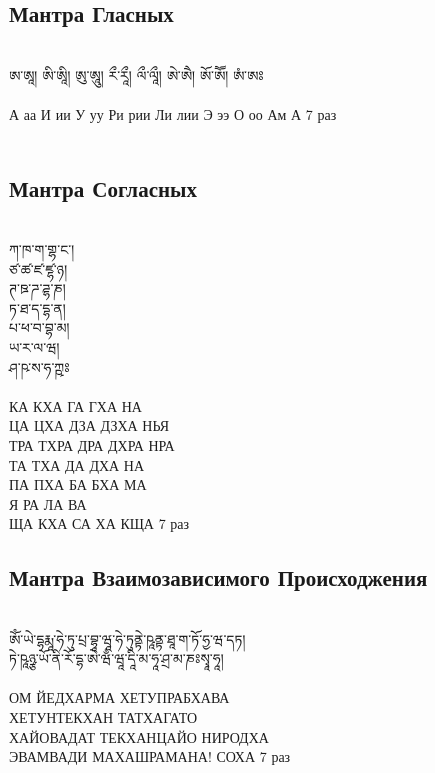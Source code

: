 \subsection*{Мантра Гласных}
\\
\ti
ཨ་ཨཱ། ཨི་ཨཱི། ཨུ་ཨཱུ། རྀ་རཱྀ། ལྀ་ལཱྀ། ཨེ་ཨཻ། ཨོ་ཨཽ། ཨཾ་ཨཿ\\
\\
\ru
А аа И ии У уу Ри рии Ли лии Э ээ О оо Ам А \hspace{1cm} 7 раз\\
\\
\subsection*{Мантра Согласных}
\\
\ti
ཀ་ཁ་ག་གྷ་ང་། \\
ཙ་ཚ་ཛ་ཛྷ་ཉ། \\
ཊ་ཋ་ཌ་ཌྷ་ཎ། \\
ཏ་ཐ་ད་དྷ་ན། \\
པ་ཕ་བ་བྷ་མ། \\
ཡ་ར་ལ་ཝ། \\
ཤ་ཥ་ས་ཧ་ཀྵཿ \\
\\
\ru
КА  КХА  ГА ГХА НА\\
ЦА  ЦХА  ДЗА ДЗХА НЬЯ\\
ТРА ТХРА ДРА ДХРА НРА\\
ТА  ТХА  ДА ДХА НА\\
ПА  ПХА  БА БХА МА\\
Я   РА   ЛА ВА\\
ЩА  КХА  СА ХА КЩА \hspace{1cm} 7 раз\\
\newpage
\subsection*{Мантра Взаимозависимого Происходжения}
\\
\ti
ཨོཾ་ཡེ་དྷརྨཱ་ཧེ་ཏུ་པྲ་བྷཱ་ཝཱ་ཧེ་ཏུནྟེ་ཥཱནྟ་ཐཱ་ག་ཏོ་ཧྱ་ཝ་དཏ།\\
 ཏེ་ཥཱཉྩ་ཡོ་ནི་རོ་དྷ་ཨེ་ཝྃ་ཝཱ་དཱི་མ་ཧཱ་ཤྲ་མ་ཎཿསྭཱ་ཧཱ།\\
 \\
\ru
ОМ  ЙЕДХАРМА  ХЕТУПРАБХАВА\\
ХЕТУНТЕКХАН ТАТХАГАТО\\
ХАЙОВАДАТ ТЕКХАНЦАЙО НИРОДХА\\
ЭВАМВАДИ МАХАШРАМАНА! СОХА \hspace{1cm} 7 раз\\

